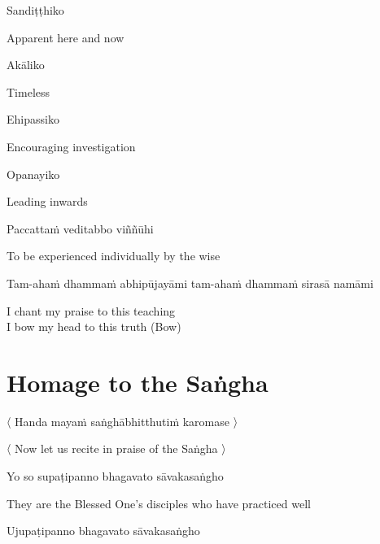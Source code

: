 Sandiṭṭhiko

\begin{english}
  Apparent here and now
\end{english}

Akāliko

\begin{english}
  Timeless
\end{english}

Ehipassiko

\begin{english}
  Encouraging investigation
\end{english}

Opanayiko

\begin{english}
  Leading inwards
\end{english}

Paccattaṁ veditabbo viññūhi

\begin{english}
  To be experienced individually by the wise
\end{english}

\begin{pali-hang}
Tam-ahaṁ dhammaṁ abhipūjayāmi tam-ahaṁ dhammaṁ sirasā namāmi
\end{pali-hang}

\begin{english}
  I chant my praise to this teaching\\
  I bow my head to this truth \hfill{(Bow)}
\end{english}

\section{Homage to the Saṅgha}
\label{homage-sangha}

\begin{leader}
  〈 Handa mayaṁ saṅghābhitthutiṁ karomase 〉
\end{leader}
\begin{leader-english}
  〈 Now let us recite in praise of the Saṅgha 〉
\end{leader-english}

Yo so supaṭipanno bhagavato sāvakasaṅgho

\begin{english}
  They are the Blessed One's disciples who have practiced well
\end{english}

Ujupaṭipanno bhagavato sāvakasaṅgho

